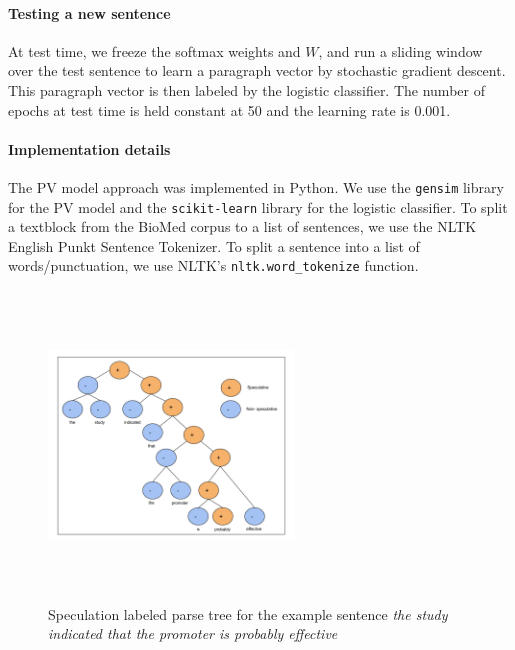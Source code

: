 \documentclass{article}
\begin{document}

\paragraph{Testing a new sentence} At test time, we freeze the softmax weights and $W$, and run a sliding window over the test sentence to learn a paragraph vector by stochastic gradient descent. This paragraph vector is then labeled by the logistic classifier. The number of epochs at test time is held constant at 50 and the learning rate is 0.001.
%
%

\paragraph{Implementation details} The PV model approach was implemented in Python. We use the \texttt{gensim} library for the PV model and the \texttt{scikit-learn} library for the logistic classifier. To split a textblock from the BioMed corpus to a list of sentences, we use the NLTK English Punkt Sentence Tokenizer. To split a sentence into a list of words/punctuation, we use NLTK's \texttt{nltk.word\_tokenize} function.

\begin{figure}
\centering
\includegraphics[width=6.5cm,height=8.2cm,keepaspectratio]{SpecParseTree.png}
\caption{Speculation labeled parse tree for the example sentence {\it the study indicated that the promoter is probably effective}}
\label{fig:parsetree}
\end{figure}
\end{document}

